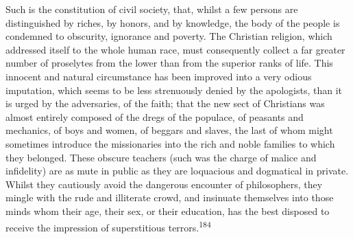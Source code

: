
Such is the constitution of civil society, that, whilst a few
persons are distinguished by riches, by honors, and by knowledge,
the body of the people is condemned to obscurity, ignorance and
poverty. The Christian religion, which addressed itself to the
whole human race, must consequently collect a far greater number
of proselytes from the lower than from the superior ranks of
life. This innocent and natural circumstance has been improved
into a very odious imputation, which seems to be less strenuously
denied by the apologists, than it is urged by the adversaries, of
the faith; that the new sect of Christians was almost entirely
composed of the dregs of the populace, of peasants and mechanics,
of boys and women, of beggars and slaves, the last of whom might
sometimes introduce the missionaries into the rich and noble
families to which they belonged. These obscure teachers (such was
the charge of malice and infidelity) are as mute in public as
they are loquacious and dogmatical in private. Whilst they
cautiously avoid the dangerous encounter of philosophers, they
mingle with the rude and illiterate crowd, and insinuate
themselves into those minds whom their age, their sex, or their
education, has the best disposed to receive the impression of
superstitious terrors.\textsuperscript{184}


